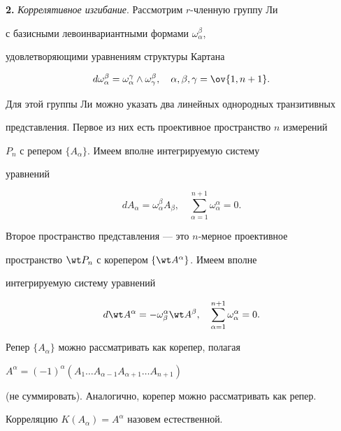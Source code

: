 \medskip


 


{\bf 2.} {\it Коррелятивное изгибание}. Рассмотрим $r$-членную группу Ли 


с базисными левоинвариантными формами $\omega^\beta_\alpha$, 


удовлетворяющими уравнениям структуры Картана 


$$ 


d\omega^\beta_\alpha=\omega^\gamma_\alpha\wedge 


\omega^\beta_\gamma,\quad \alpha,\beta,\gamma=\ov{1,n+1}. 


$$ 


Для этой группы Ли можно указать два линейных однородных транзитивных 


представления. Первое из них есть проективное пространство $n$ измерений 


$P_n$ с репером $\{A_\alpha\}$. Имеем вполне интегрируемую систему 


уравнений 


$$ 


dA_\alpha=\omega^\beta_\alpha A_\beta,\quad 


\sum^{n+1}_{\alpha=1}\omega^\alpha_\alpha=0. 


$$ 


Второе пространство представления --- это $n$-мерное проективное 


пространство $\wt P_n$ с корепером $\{\wt A^\alpha\}$. Имеем вполне 


интегрируемую систему уравнений 


$$ 


d\wt A^\alpha=-\omega^\alpha_\beta\wt A^\beta,\quad 


\sum^{n+1}_{\alpha=1}\omega^\alpha_\alpha=0. 


$$ 


Репер $\{A_\alpha\}$ можно рассматривать как корепер, полагая 


$A^\alpha=(-1)^\alpha(A_1\dotsc A_{\alpha-1}A_{\alpha+1}\dotsc A_{n+1})$ 


(не суммировать). Аналогично, корепер можно рассматривать как репер. 


 


\begin{defn} 


Корреляцию $K(A_\alpha)=A^\alpha$ назовем естественной. 


\end{defn} 


